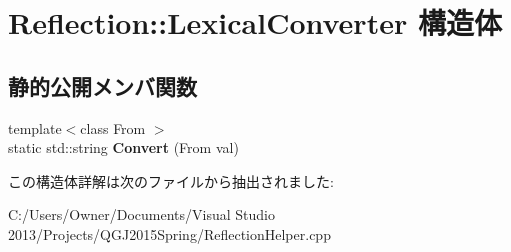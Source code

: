 \hypertarget{struct_reflection_1_1_lexical_converter}{}\section{Reflection\+:\+:Lexical\+Converter 構造体}
\label{struct_reflection_1_1_lexical_converter}
\subsection*{静的公開メンバ関数}
\begin{DoxyCompactItemize}
\item 
{\footnotesize template$<$class From $>$ }\\static std\+::string {\bfseries Convert} (From val)\hypertarget{struct_reflection_1_1_lexical_converter_af3242099c4c4bfabd0dbea8b4e8c02da}{}\label{struct_reflection_1_1_lexical_converter_af3242099c4c4bfabd0dbea8b4e8c02da}

\end{DoxyCompactItemize}


この構造体詳解は次のファイルから抽出されました\+:\begin{DoxyCompactItemize}
\item 
C\+:/\+Users/\+Owner/\+Documents/\+Visual Studio 2013/\+Projects/\+Q\+G\+J2015\+Spring/Reflection\+Helper.\+cpp\end{DoxyCompactItemize}
